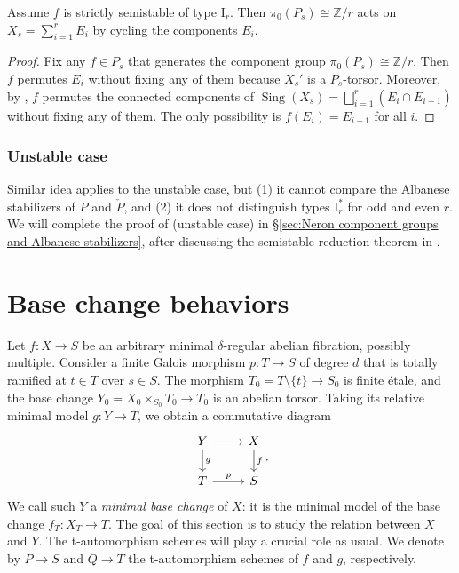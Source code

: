 \documentclass[reqno, letterpaper]{amsart}
\numberwithin{equation}{subsection}
\let\to\longrightarrow
\newcommand{\ZZ}{\mathbb{Z}}
\DeclareMathOperator{\Sing}{Sing}
\begin{document}
			\begin{corollary} \label{cor:pi_0-action on X_s}
				Assume $f$ is strictly semistable of type $\mathrm I_r$. Then $\pi_0(P_s) \cong \ZZ/r$ acts on $X_s = \sum_{i=1}^r E_i$ by cycling the components $E_i$.
			\end{corollary}
			\begin{proof}
				Fix any $f \in P_s$ that generates the component group $\pi_0(P_s) \cong \ZZ/r$. Then $f$ permutes $E_i$ without fixing any of them because $X_s'$ is a $P_s$-torsor. Moreover, by , $f$ permutes the connected components of $\Sing(X_s) = \bigsqcup_{i=1}^r (E_i \cap E_{i+1})$ without fixing any of them. The only possibility is $f(E_i) = E_{i+1}$ for all $i$.
			\end{proof}
			
			
			
		\subsubsection{Unstable case}
			Similar idea applies to the unstable case, but (1) it cannot compare the Albanese stabilizers of $P$ and $\check P$, and (2) it does not distinguish types $\mathrm I_r^*$ for odd and even $r$. We will complete the proof of  (unstable case) in \S \ref{sec:Neron component groups and Albanese stabilizers}, after discussing the semistable reduction theorem in .
			
			
			
\section{Base change behaviors} \label{sec:general base change}
	Let $f : X \to S$ be an arbitrary minimal $\delta$-regular abelian fibration, possibly multiple. Consider a finite Galois morphism $p : T \to S$ of degree $d$ that is totally ramified at $t \in T$ over $s \in S$. The morphism $T_0 = T \setminus \{ t \} \to S_0$ is finite \'etale, and the base change $Y_0 = X_0 \times_{S_0} T_0 \to T_0$ is an abelian torsor. Taking its relative minimal model $g : Y \to T$, we obtain a commutative diagram
	\[\begin{tikzcd}
		Y \arrow[r, dashed] \arrow[d, "g"] & X \arrow[d, "f"] \\
		T \arrow[r, "p"] & S
	\end{tikzcd}.\]
	We call such $Y$ a \emph{minimal base change} of $X$: it is the minimal model of the base change $f_T : X_T \to T$. The goal of this section is to study the relation between $X$ and $Y$. The t-automorphism schemes will play a crucial role as usual. We denote by $P \to S$ and $Q \to T$ the t-automorphism schemes of $f$ and $g$, respectively.
	
\end{document}
